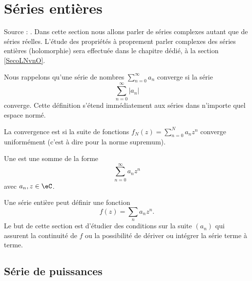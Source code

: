 \section{Séries entières}

Source : \cite{RomainBoilEnt}. Dans cette section nous allons parler de séries complexes autant que de séries réelles. L'étude des propriétés à proprement parler complexes des séries entières (holomorphie) sera effectuée dans le chapitre dédié, à la section \ref{SecoLNvnO}.

Nous rappelons qu'une série de nombres \( \sum_{n=0}^{\infty}a_n\) converge  si la série
\begin{equation}
    \sum_{n=0}^{\infty}| a_n |
\end{equation}
converge. Cette définition s'étend immédiatement aux séries dans n'importe quel espace normé.

La convergence est  si la suite de fonctions \( f_N(z)=\sum_{n=0}^N a_nz^n\) converge uniformément (c'est à dire pour la norme supremum).

\begin{definition}
    Une  est une somme de la forme
    \begin{equation}
        \sum_{n=0}^{\infty}a_nz^n
    \end{equation}
    avec \( a_n,z\in\eC\).    
\end{definition}
Une série entière peut définir une fonction
\begin{equation}
    f(z)=\sum_na_nz^n.
\end{equation}
Le but de cette section est d'étudier des conditions sur la suite \( (a_n)\) qui assurent la continuité de \( f\) ou la possibilité de dériver ou intégrer la série terme à terme.

					\subsection{Série de puissances}

